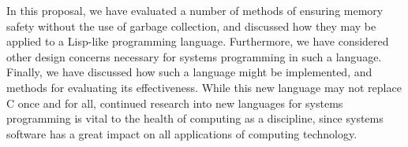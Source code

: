 \documentclass[11pt,a4paper]{article}
\theoremstyle{break}
\begin{document}
In this proposal, we have evaluated a number of methods of ensuring memory safety without the use of garbage collection, and discussed how they may be applied to a Lisp-like programming language. Furthermore, we have considered other design concerns necessary for systems programming in such a language. Finally, we have discussed how such a language might be implemented, and methods for evaluating its effectiveness. While this new language may not replace C once and for all, continued research into new languages for systems programming is vital to the health of computing as a discipline, since systems software has a great impact on all applications of computing technology.

\pagebreak
\begingroup
\setlength{\emergencystretch}{1em} %
\printbibliography
\endgroup
\end{document}
